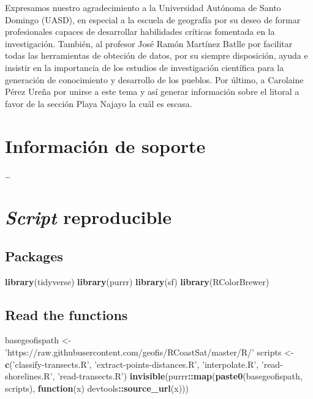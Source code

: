 \documentclass[11pt,]{article}
\newenvironment{Shaded}{\begin{snugshade}}{\end{snugshade}}
\newcommand{\KeywordTok}[1]{\textcolor[rgb]{0.13,0.29,0.53}{\textbf{#1}}}
\newcommand{\StringTok}[1]{\textcolor[rgb]{0.31,0.60,0.02}{#1}}
\newcommand{\ControlFlowTok}[1]{\textcolor[rgb]{0.13,0.29,0.53}{\textbf{#1}}}
\newcommand{\OperatorTok}[1]{\textcolor[rgb]{0.81,0.36,0.00}{\textbf{#1}}}
\newcommand{\NormalTok}[1]{#1}
\begin{document}
Expresamos nuestro agradecimiento a la Universidad Autónoma de Santo
Domingo (UASD), en especial a la escuela de geografía por su deseo de
formar profesionales capaces de desarrollar habilidades críticas
fomentada en la investigación. También, al profesor José Ramón Martínez
Batlle por facilitar todas las herramientas de obteción de datos, por su
siempre disposición, ayuda e insistir en la importancia de los estudios
de investigación científica para la generación de conocimiento y
desarrollo de los pueblos. Por último, a Carolaine Pérez Ureña por
unirse a este tema y así generar información sobre el litoral a favor de
la sección Playa Najayo la cuál es escasa.

\section{Información de soporte}\label{informaciuxf3n-de-soporte}

\ldots

\section{\texorpdfstring{\emph{Script}
reproducible}{Script reproducible}}\label{script-reproducible}

\subsection{Packages}\label{packages}

\begin{Shaded}
\begin{Highlighting}[]
\KeywordTok{library}\NormalTok{(tidyverse)}
\KeywordTok{library}\NormalTok{(purrr)}
\KeywordTok{library}\NormalTok{(sf)}
\KeywordTok{library}\NormalTok{(RColorBrewer)}
\end{Highlighting}
\end{Shaded}

\subsection{Read the functions}\label{read-the-functions}

\begin{Shaded}
\begin{Highlighting}[]
\NormalTok{basegeofispath <-}\StringTok{ 'https://raw.githubusercontent.com/geofis/RCoastSat/master/R/'}
\NormalTok{scripts <-}\StringTok{ }\KeywordTok{c}\NormalTok{(}\StringTok{'classify-transects.R'}\NormalTok{, }\StringTok{'extract-points-distances.R'}\NormalTok{,}
             \StringTok{'interpolate.R'}\NormalTok{, }\StringTok{'read-shorelines.R'}\NormalTok{, }\StringTok{'read-transects.R'}\NormalTok{)}
\KeywordTok{invisible}\NormalTok{(purrr}\OperatorTok{::}\KeywordTok{map}\NormalTok{(}\KeywordTok{paste0}\NormalTok{(basegeofispath, scripts), }\ControlFlowTok{function}\NormalTok{(x) devtools}\OperatorTok{::}\KeywordTok{source_url}\NormalTok{(x)))}
\end{Highlighting}
\end{Shaded}
\end{document}
